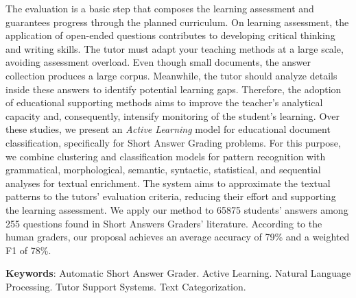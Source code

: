 The evaluation is a basic step that composes the learning assessment and guarantees progress through the planned curriculum. On learning assessment, the application of open-ended questions contributes to developing critical thinking and writing skills. The tutor must adapt your teaching methods at a large scale, avoiding assessment overload. Even though small documents, the answer collection produces a large corpus. Meanwhile, the tutor should analyze details inside these answers to identify potential learning gaps. Therefore, the adoption of educational supporting methods aims to improve the teacher's analytical capacity and, consequently, intensify monitoring of the student's learning. Over these studies, we present an \textit{Active Learning} model for educational document classification, specifically for Short Answer Grading problems. For this purpose, we combine clustering and classification models for pattern recognition with grammatical, morphological, semantic, syntactic, statistical, and sequential analyses for textual enrichment. The system aims to approximate the textual patterns to the tutors' evaluation criteria, reducing their effort and supporting the learning assessment. We apply our method to 65875 students' answers among 255 questions found in Short Answers Graders' literature. According to the human graders, our proposal achieves an average accuracy of 79\% and a weighted F1 of 78\%.

\textbf{Keywords}: Automatic Short Answer Grader. Active Learning. Natural Language Processing. Tutor Support Systems. Text Categorization.